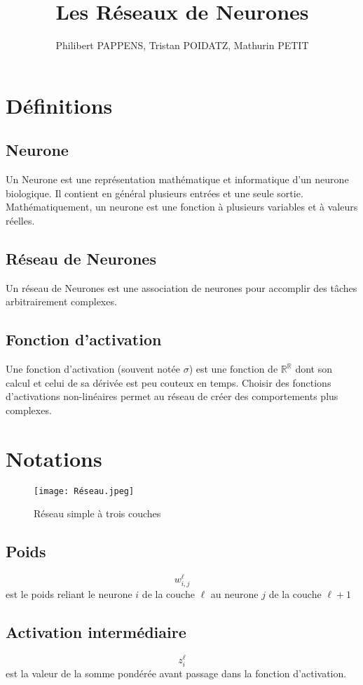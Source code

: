 \documentclass[10pt,a4paper,titlepage]{article}
\title{Les Réseaux de Neurones}
\author{Philibert PAPPENS, Tristan POIDATZ, Mathurin PETIT}
\begin{document}
\maketitle
\tableofcontents

\section{Définitions}
\subsection{Neurone}
Un Neurone est une représentation mathématique et informatique d'un neurone biologique. Il contient en général plusieurs entrées et une seule sortie.
Mathématiquement, un neurone est une fonction à plusieurs variables et à valeurs réelles.

\subsection{Réseau de Neurones}
Un réseau de Neurones est une association de neurones pour accomplir des tâches arbitrairement complexes.

\subsection{Fonction d'activation}
Une fonction d'activation (souvent notée $\sigma$) est une fonction de $\mathbb{R^R}$ dont son calcul et celui de sa dérivée est peu couteux en temps. Choisir des fonctions d'activations non-linéaires permet au réseau de créer des comportements plus complexes.

\section{Notations}
\begin{figure}[H]
	\texttt{[image: Réseau.jpeg]}
	\caption{Réseau simple à trois couches}
	\label{fig:Réseau}
\end{figure}

\subsection{Poids}
\[w_{i,j}^{\ell}\] est le poids reliant le neurone $i$ de la couche $\ell$ au neurone $j$ de la couche $\ell+1$

\subsection{Activation intermédiaire}
\[z_{i}^\ell\] est la valeur de la somme pondérée avant passage dans la fonction d'activation.
\end{document}
